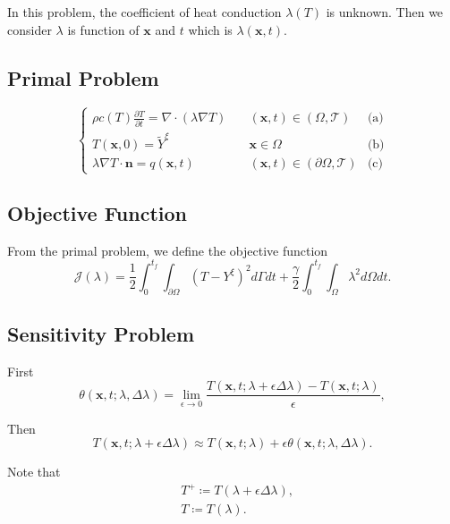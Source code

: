 \documentclass[UTF-8]{article}
\begin{document}
In this problem, the coefficient of heat conduction $\lambda(T)$ is unknown. Then we consider $\lambda$ is function of $\pmb{x}$ and $t$ which is $\lambda(\pmb{x}, t)$.

\subsection{Primal Problem}
\begin{equation}\label{equ001}
	\left\{
	\begin{array}{lll}
		\rho c(T) \frac{\partial T}{\partial t} = \nabla \cdot \left( \lambda \nabla T \right) \quad &(\pmb{x},t) \in (\Omega, \mathcal{T}) &\text{(a)}\\
		T(\pmb{x},0) = \tilde{Y}^\xi & \pmb{x} \in \Omega &\text{(b)}\\
		\lambda \nabla T \cdot \pmb{n} = q(\pmb{x},t) & (\pmb{x},t) \in (\partial \Omega, \mathcal{T}) &\text{(c)}
	\end{array}
	\right.
\end{equation}

\subsection{Objective Function}
From the primal problem, we define the objective function
\begin{equation}
	\mathcal{J}(\lambda) = \frac{1}{2} \int_{0}^{t_f} \int_{\partial \Omega} \left(T-Y^\xi\right)^2 d\Gamma dt + \frac{\gamma}{2} \int_{0}^{t_f}\int_{\Omega} \lambda ^2 d\Omega dt.
\end{equation}

\subsection{Sensitivity Problem}
First
\begin{equation}
	\theta (\pmb{x}, t; \lambda, \Delta \lambda) = \lim_{\epsilon \to 0} \frac{T(\pmb{x}, t; \lambda + \epsilon \Delta \lambda) - T(\pmb{x}, t; \lambda)}{\epsilon},
\end{equation}

Then 
\begin{equation}
	T(\pmb{x}, t; \lambda + \epsilon \Delta \lambda) \approx T(\pmb{x}, t; \lambda) + \epsilon \theta(\pmb{x}, t; \lambda, \Delta \lambda).
\end{equation}

Note that
\begin{align*}
	&T^+ \coloneqq T(\lambda + \epsilon \Delta \lambda),\\
	&T \coloneqq T(\lambda).
\end{align*}
\end{document}
